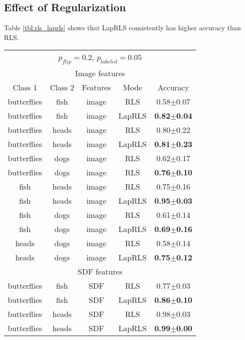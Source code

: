 \documentclass[anon,11pt]{9520} %
\begin{document}
\subsection{Effect of Regularization}
Table \ref{tbl:rls_laprls} shows that LapRLS consistently has higher accuracy than RLS.
\begin{table}[h!]
\tiny
\begin{center}
\begin{tabular}{|c|c|c|c|c|}
\multicolumn{5}{c}{$p_{flip} = 0.2$, $p_{labeled} = 0.05$}\\
\multicolumn{5}{c}{Image features}\\
\hline
Class 1 & Class 2 & Features & Mode & Accuracy\\\hline

butterflies&	fish&	image&	RLS&	0.58$\pm$0.07\\
butterflies&	fish&	image&	LapRLS& \textbf{0.82$\pm$0.04}\\\hline

butterflies&	heads&	image&  RLS& 0.80$\pm$0.22\\
butterflies&	heads&	image&	LapRLS& \textbf{0.81$\pm$0.23}\\\hline

butterflies&	dogs&	image&	RLS&	0.62$\pm$0.17\\
butterflies&	dogs&	image&	RLS&      \textbf{0.76$\pm$0.10}\\\hline

fish&	heads&	image&	RLS&	0.75$\pm$0.16\\
fish&	heads&	image&	LapRLS&	\textbf{0.95$\pm$0.03}\\\hline

fish&	dogs&	image&	RLS&	0.61$\pm$0.14\\
fish&	dogs&	image&	LapRLS&	\textbf{0.69$\pm$0.16}\\\hline

heads&	dogs&	image&	RLS&	0.58$\pm$0.14\\
heads&	dogs&	image&	LapRLS&	\textbf{0.75$\pm$0.12}\\\hline
\multicolumn{5}{c}{SDF features}\\\hline
butterflies&	fish&	SDF&    RLS&	0.77$\pm$0.03\\
butterflies&	fish&	SDF&	LapRLS&	\textbf{0.86$\pm$0.10}\\\hline

butterflies&	heads&	SDF&	RLS&	0.98$\pm$0.03\\
butterflies&	heads&	SDF&	LapRLS&	\textbf{0.99$\pm$0.00}\\\hline


\end{tabular}
\end{center}
\end{table}
\end{document}
